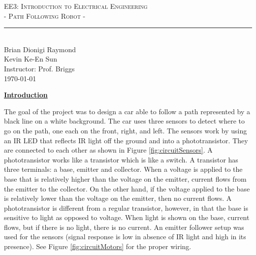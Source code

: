 \documentclass[twocolumn]{article}
\newcommand{\classname}{EE3: Introduction to Electrical Engineering}
\newcommand{\project}{- Path Following Robot -}
\newcommand{\authorname}{Brian Dionigi Raymond\\Kevin Ke-En Sun}
\newcommand{\instructor}{Prof. Briggs}
\newcommand{\sectionTitle}[1]{ {\large\textbf{\uline{#1}}} \\ \vspace{1.5em} }
\newcommand{\textIntroOne}{The goal of the project was to design a car able to follow a path represented by a black line on a white background. The car uses three sensors to detect where to go on the path, one each on the front, right, and left. The sensors work by using an IR LED that reflects IR light off the ground and into a phototransistor. They are connected to each other as shown in Figure \ref{fig:circuitSensors}. A phototransistor works like a transistor which is like a switch. A transistor has three terminals: a base, emitter and collector. When a voltage is applied to the base that is relatively higher than the voltage on the emitter, current flows from the emitter to the collector. On the other hand, if the voltage applied to the base is relatively lower than the voltage on the emitter, then no current flows. A phototransistor is different from a regular transistor, however, in that the base is sensitive to light as opposed to voltage. When light is shown on the base, current flows, but if there is no light, there is no current. An emitter follower setup was used for the sensors (signal response is low in absence of IR light and high in its presence). See Figure \ref{fig:circuitMotors} for the proper wiring.}
\begin{document}
		
	\begin{center}
		{\LARGE \textsc{\classname \\ \project} \\ \vspace{4pt}}
		\rule[13pt]{0.5\textwidth}{1pt} \\ %
		{\authorname \\ \vspace{2pt}
			Instructor: \instructor \\ \vspace{2pt}
			\today \\ \vspace{2pt}
		}
	\end{center}	
	
	\begin{flushleft}
		\sectionTitle{Introduction}
		
		\textIntroOne \\ \vspace{1em}
		
		\begin{figure}[!htb]


\end{figure}
\end{flushleft}
\end{document}
